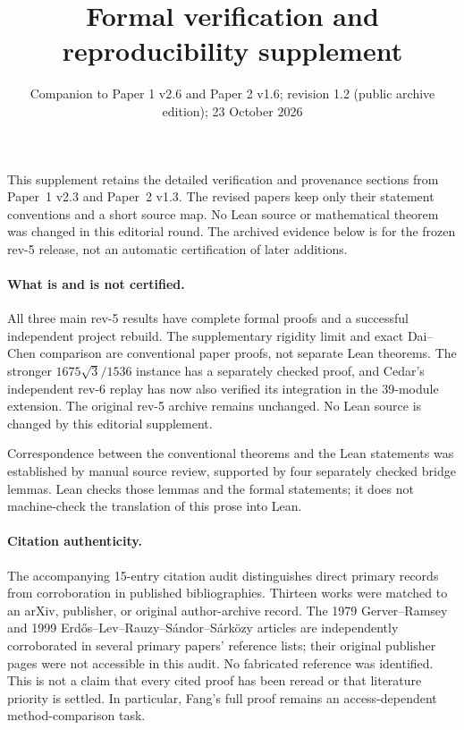 \documentclass[11pt]{article}
\title{Formal verification and reproducibility supplement}
\author{}
\date{Companion to Paper 1 v2.6 and Paper 2 v1.6; revision 1.2 (public archive edition); 23 October 2026}
\begin{document}
\maketitle
This supplement retains the detailed verification and provenance sections from
Paper~1 v2.3 and Paper~2 v1.3. The revised papers keep only their statement
conventions and a short source map. No Lean source or mathematical theorem was
changed in this editorial round. The archived evidence below is for the frozen
rev-5 release, not an automatic certification of later additions.

\paragraph{What is and is not certified.}
All three main rev-5 results have complete formal proofs and a successful
independent project rebuild. The supplementary rigidity limit and exact
Dai--Chen comparison are conventional paper proofs, not separate Lean theorems.
The stronger $1675\sqrt3/1536$ instance has a separately checked proof, and
Cedar's independent rev-6 replay has now also verified its integration in the
39-module extension. The original rev-5 archive remains unchanged.
No Lean source is changed by this editorial supplement.

Correspondence between the conventional theorems and the Lean statements was
established by manual source review, supported by four separately checked
bridge lemmas. Lean checks those lemmas and the formal statements; it does not
machine-check the translation of this prose into Lean.

\paragraph{Citation authenticity.}
The accompanying 15-entry citation audit distinguishes direct primary records
from corroboration in published bibliographies. Thirteen works were matched to
an arXiv, publisher, or original author-archive record. The 1979 Gerver--Ramsey
and 1999 Erd\H{o}s--Lev--Rauzy--S\'andor--S\'ark\"ozy articles are independently
corroborated in several primary papers' reference lists; their original
publisher pages were not accessible in this audit. No fabricated reference was
identified. This is not a claim that every cited proof has been reread or that
literature priority is settled. In particular, Fang's full proof remains an
access-dependent method-comparison task.
\end{document}

